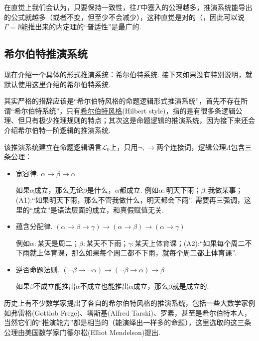 \documentclass[main.tex]{subfiles}
\begin{document}
在直觉上我们会认为，只要保持一致性，往\(\Gamma\)中塞入的公理越多，推演系统能导出的公式就越多（或者不变，但至少不会减少），这种直觉是对的（，因此可以说\(\Gamma=\emptyset\)能推出来的内定理的“普适性”是最广的.

\subsection{希尔伯特推演系统}

现在介绍一个具体的形式推演系统：希尔伯特系统. 接下来如果没有特别说明，就默认使用这里介绍的希尔伯特系统. 

其实严格的措辞应该是“希尔伯特风格的命题逻辑形式推演系统”，首先不存在所谓“希尔伯特系统”，只有\uline{希尔伯特风格}(Hilbert style)，指的是有很多条逻辑公理、但只有极少推理规则的特点；其次这是命题逻辑的推演系统，因为接下来还会介绍希尔伯特一阶逻辑的推演系统. 

该推演系统建立在命题逻辑语言\(\mathcal{L}_0\)上，只用\(\neg, \to\)两个连接词，逻辑公理\(\Lambda\)包含三条公理：
\begin{itemize}
    \item [(A1)] 宽容律. \(\alpha \to \beta \to \alpha\)
    \begin{note}
        如果\(\alpha\)成立，那么无论\(\beta\)是什么，\(\alpha\)都成立. 例如\(\alpha:\)明天下雨；\(\beta:\)我做某事；(A1):“如果明天下雨，那么不管我做什么，明天都会下雨”. 需要再三强调，这里的“成立”是语法层面的成立，和真假赋值无关.
    \end{note}
    \item [(A2)] 蕴含分配律. \((\alpha \to \beta \to \gamma) \to (\alpha \to \beta) \to (\alpha \to \gamma)\)
    \begin{note}
        例如\(\alpha:\)某天是周二；\(\beta:\)某天不下雨；\(\gamma:\)某天上体育课；(A2):“如果每个周二不下雨就上体育课，那么如果每个周二都不下雨，就每个周二都上体育课”.
    \end{note}
    \item [(A3)] 逆否命题法则. \((\neg \beta \to \neg \alpha) \to (\neg \beta \to \alpha) \to \beta\)
    \begin{note}
        如果\(\beta\)不成立能推出\(\alpha\)不成立也能推出\(\alpha\)成立，那么\(\beta\)就是成立的.
    \end{note}
\end{itemize}

历史上有不少数学家提出了各自的希尔伯特风格的推演系统，包括一些大数学家例如弗雷格(Gottlob Frege)、塔斯基(Alfred Tarski)、罗素，甚至是希尔伯特本人，当然它们的“推演能力”都是相当的（能演绎出一样多的命题），这里选取的这三条公理由美国数学家门德尔松(Elliot Mendelson)提出.
\end{document}
